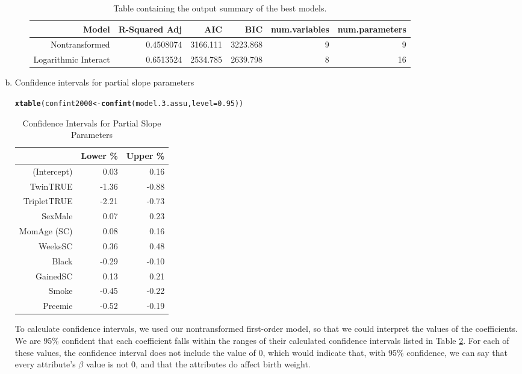 \documentclass{article}\usepackage[]{graphicx}\usepackage[]{xcolor}
\makeatletter
\newcommand{\hlnum}[1]{\textcolor[rgb]{0.686,0.059,0.569}{#1}}%
\newcommand{\hlstd}[1]{\textcolor[rgb]{0.345,0.345,0.345}{#1}}%
\newcommand{\hlkwb}[1]{\textcolor[rgb]{0.69,0.353,0.396}{#1}}%
\newcommand{\hlkwc}[1]{\textcolor[rgb]{0.333,0.667,0.333}{#1}}%
\newcommand{\hlkwd}[1]{\textcolor[rgb]{0.737,0.353,0.396}{\textbf{#1}}}%
\newenvironment{kframe}{%
 \def\at@end@of@kframe{}%
 \ifinner\ifhmode%
  \def\at@end@of@kframe{\end{minipage}}%
  \begin{minipage}{\columnwidth}%
 \fi\fi%
 \def\FrameCommand##1{\hskip\@totalleftmargin \hskip-\fboxsep
 \colorbox{shadecolor}{##1}\hskip-\fboxsep
     \hskip-\linewidth \hskip-\@totalleftmargin \hskip\columnwidth}%
 \MakeFramed {\advance\hsize-\width
   \@totalleftmargin\z@ \linewidth\hsize
   \@setminipage}}%
 {\par\unskip\endMakeFramed%
 \at@end@of@kframe}
\newenvironment{knitrout}{}{} %
\makeatother
\begin{document}
\begin{enumerate}[a.]
\begin{enumerate}[i.]
\begin{table}[H]
\centering
\begin{tabular}{rrrrrr}
  \hline
   Model & R-Squared Adj &  AIC &  BIC & num.variables & num.parameters\\
  \hline
  Nontransformed & 0.4508074 & 3166.111 & 3223.868 & 9 & 9\\
  Logarithmic Interact & 0.6513524 & 2534.785 & 2639.798 & 8 & 16\\
  \hline
\end{tabular}
\caption{Table containing the output summary of the best models.}
\label{Model Output Summary}
\end{table}
\end{enumerate} %

\item Confidence intervals for partial slope parameters
\begin{knitrout}
\color{fgcolor}\begin{kframe}
\begin{alltt}
\hlkwd{xtable}\hlstd{(confint2000}\hlkwb{<-}\hlkwd{confint}\hlstd{(model.3.assu,} \hlkwc{level}\hlstd{=}\hlnum{0.95}\hlstd{))}
\end{alltt}
\end{kframe}
\end{knitrout}
\begin{table}[H]
\centering
\begin{tabular}{rrr}
  \hline
& Lower \% & Upper \% \\
  \hline
(Intercept) & 0.03 & 0.16 \\
  TwinTRUE & -1.36 & -0.88 \\
  TripletTRUE & -2.21 & -0.73 \\
  SexMale & 0.07 & 0.23 \\
  MomAge (SC) & 0.08 & 0.16 \\
  WeeksSC & 0.36 & 0.48 \\
  Black & -0.29 & -0.10 \\
  GainedSC & 0.13 & 0.21 \\
  Smoke & -0.45 & -0.22 \\
  Preemie & -0.52 & -0.19 \\
   \hline
\end{tabular}
\caption{Confidence Intervals for Partial Slope Parameters}
\label{CIs for Partial Slope Parameters}
\end{table}

To calculate confidence intervals, we used our nontransformed first-order model, so that we could interpret the values of the coefficients. We are 95\% confident that each coefficient falls within the ranges of their calculated confidence intervals listed in Table \ref{CIs for Partial Slope Parameters}. For each of these values, the confidence interval does not include the value of 0, which would indicate that, with 95\% confidence, we can say that every attribute's $\beta$ value is not 0, and that the attributes do affect birth weight.


\end{enumerate}
\end{document}
